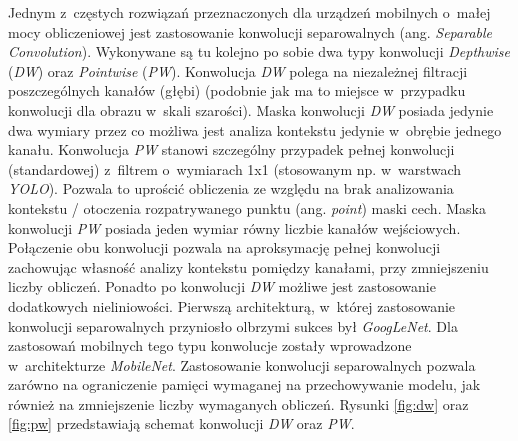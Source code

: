 Jednym z~częstych rozwiązań przeznaczonych dla urządzeń mobilnych o~małej mocy obliczeniowej jest zastosowanie konwolucji separowalnych (ang. \emph{Separable Convolution}). 
Wykonywane są tu kolejno po sobie dwa typy konwolucji \emph{Depthwise} (\emph{DW}) oraz \emph{Pointwise} (\emph{PW}). 
Konwolucja \emph{DW} polega na niezależnej filtracji poszczególnych kanałów (głębi) (podobnie jak ma to miejsce w~przypadku konwolucji dla obrazu w~skali szarości).
Maska konwolucji \emph{DW} posiada jedynie dwa wymiary przez co możliwa jest analiza kontekstu jedynie w~obrębie jednego kanału.
Konwolucja \emph{PW} stanowi szczególny przypadek pełnej konwolucji (standardowej) z~filtrem o~wymiarach 1x1 (stosowanym np. w~warstwach \emph{YOLO}).
Pozwala to uprościć obliczenia ze względu na brak analizowania kontekstu / otoczenia rozpatrywanego punktu (ang. \emph{point}) maski cech.
Maska konwolucji \emph{PW} posiada jeden wymiar równy liczbie kanałów wejściowych.
Połączenie obu konwolucji pozwala na aproksymację pełnej konwolucji zachowując własność analizy kontekstu pomiędzy kanałami, przy zmniejszeniu liczby obliczeń. 
Ponadto po konwolucji \emph{DW} możliwe jest zastosowanie dodatkowych nieliniowości.
Pierwszą architekturą, w~której zastosowanie konwolucji separowalnych przyniosło olbrzymi sukces był \emph{GoogLeNet}\cite{inception_googlenet}. 
Dla zastosowań mobilnych tego typu konwolucje zostały wprowadzone w~architekturze \emph{MobileNet}\cite{mobilenet}. 
Zastosowanie konwolucji separowalnych pozwala zarówno na ograniczenie pamięci wymaganej na przechowywanie modelu, jak również na zmniejszenie liczby wymaganych obliczeń.
Rysunki \ref{fig:dw} oraz \ref{fig:pw} przedstawiają schemat konwolucji \emph{DW} oraz \emph{PW}. 


